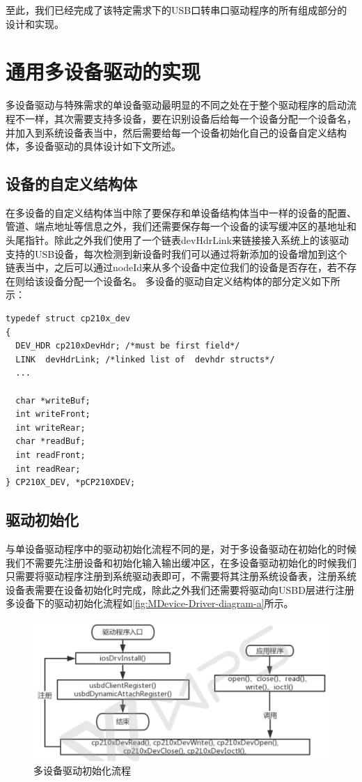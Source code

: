 至此，我们已经完成了该特定需求下的USB口转串口驱动程序的所有组成部分的设计和实现。

\section{通用多设备驱动的实现}
	多设备驱动与特殊需求的单设备驱动最明显的不同之处在于整个驱动程序的启动流程不一样，其次需要支持多设备，要在识别设备后给每一个设备分配一个设备名，并加入到系统设备表当中，然后需要给每一个设备初始化自己的设备自定义结构体，多设备驱动的具体设计如下文所述。


\subsection{设备的自定义结构体}

在多设备的自定义结构体当中除了要保存和单设备结构体当中一样的设备的配置、管道、端点地址等信息之外，我们还需要保存每一个设备的读写缓冲区的基地址和头尾指针。除此之外我们使用了一个链表devHdrLink来链接接入系统上的该驱动支持的USB设备，每次检测到新设备时我们可以通过将新添加的设备增加到这个链表当中，之后可以通过nodeId来从多个设备中定位我们的设备是否存在，若不存在则给该设备分配一个设备名。
多设备的驱动自定义结构体的部分定义如下所示：
\lstset{language=C}
\begin{lstlisting}
typedef struct cp210x_dev
{
  DEV_HDR cp210xDevHdr; /*must be first field*/
  LINK 	devHdrLink; /*linked list of  devhdr structs*/
  ...
  
  char *writeBuf;
  int writeFront;
  int writeRear;
  char *readBuf;
  int readFront;
  int readRear;
} CP210X_DEV, *pCP210XDEV;
\end{lstlisting}

	

\subsection{驱动初始化}
	与单设备驱动程序中的驱动初始化流程不同的是，对于多设备驱动在初始化的时候我们不需要先注册设备和初始化输入输出缓冲区，在多设备驱动初始化的时候我们只需要将驱动程序注册到系统驱动表即可，不需要将其注册系统设备表，注册系统设备表需要在设备初始化时完成，除此之外我们还需要将驱动向USBD层进行注册多设备下的驱动初始化流程如\autoref{fig:MDevice-Driver-diagram-a}所示。

	
\begin{figure}[!h]
\centering
\includegraphics[width=1.0\textwidth]{./graphics/MDev-Drv-Diagram-a.pdf}
\caption{多设备驱动初始化流程}\label{fig:MDevice-Driver-diagram-a}
\end{figure}


